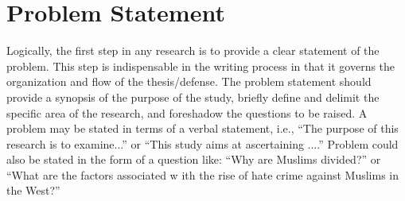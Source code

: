 \section{Problem Statement} \label{problem}

Logically, the first step in any research is to provide a clear statement of
the problem. This step is indispensable in the writing process in that it
governs the organization and flow of the thesis/defense. The problem statement
should provide a synopsis of the purpose of the study, briefly define and
delimit the specific area of the research, and foreshadow the questions to be
raised. A problem may be stated in terms of a verbal statement, i.e., ``The
purpose of this research is to examine...'' or ``This study aims at
ascertaining ....'' Problem could also be stated in the form of a question
like: ``Why are Muslims divided?'' or ``What are the factors associated w ith
the rise of hate crime against Muslims in the West?''
